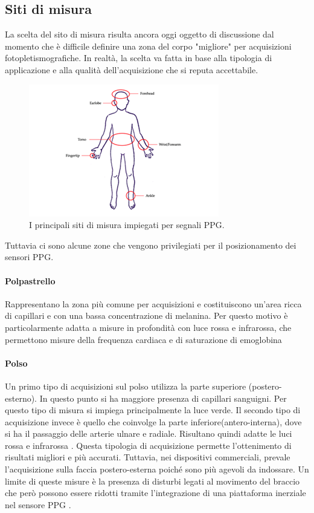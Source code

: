 \subsection{Siti di misura}
La scelta del sito di misura risulta ancora oggi oggetto di discussione dal momento che è difficile definire una zona del corpo "migliore" per acquisizioni fotopletismografiche. In realtà, la scelta va fatta in base alla tipologia di applicazione e alla qualità dell'acquisizione che si reputa accettabile.
\begin{figure}[h]
	\centering
	\includegraphics[width=0.7\linewidth]{ImageFiles/Fotopletismografia/ZoneAcquisizione}
	\caption{I principali siti di misura impiegati per segnali PPG.}
	\label{fig:ZoneAcquisizione}
\end{figure}
Tuttavia ci sono alcune zone che vengono privilegiati per il posizionamento dei sensori PPG.
	\paragraph{Polpastrello}
	 Rappresentano la zona più comune per acquisizioni e costituiscono un'area ricca di capillari e con una bassa concentrazione di melanina. Per questo motivo è particolarmente adatta a misure in profondità con luce rossa e infrarossa, che permettono misure della frequenza cardiaca e di saturazione di emoglobina
	 \paragraph{Polso}
	 Un primo tipo di acquisizioni sul polso utilizza la parte superiore (postero-esterno). In questo punto si ha maggiore presenza di capillari sanguigni. Per questo tipo di misura si impiega principalmente la luce verde.
	 Il secondo tipo di acquisizione invece è quello che coinvolge la parte inferiore(antero-interna), dove si ha il passaggio delle arterie ulnare e radiale. Risultano quindi adatte le luci rossa e infrarossa . Questa tipologia di acquisizione permette l'ottenimento di risultati migliori e più accurati.
	 Tuttavia, nei dispositivi commerciali, prevale l'acquisizione sulla faccia postero-esterna poiché sono più agevoli da indossare.
	 Un limite di queste misure è la presenza di disturbi legati al movimento del braccio che però possono essere ridotti tramite l'integrazione di una piattaforma inerziale nel sensore PPG \cite{Ghamari2018}.

